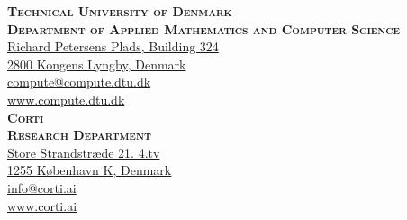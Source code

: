 
\thispagestyle{empty} %

\vspace*{\fill}
\small%
\noindent
\textsc{\textbf{Technical University of Denmark}}\\
\textsc{\textbf{Department of Applied Mathematics and Computer Science}}
\smallskip\\
\href{https://goo.gl/maps/Dx6rNjGT9Ad5xKgZ6}{%
Richard Petersens Plads, Building 324\\
2800 Kongens Lyngby, Denmark}\\
\href{mailto:compute@compute.dtu.dk}{compute@compute.dtu.dk}\\
\href{www.compute.dtu.dk}{www.compute.dtu.dk}
\bigskip\\
\noindent
\textsc{\textbf{Corti}}\\
\textsc{\textbf{Research Department}}
\smallskip\\
\href{https://goo.gl/maps/X7en4p8vaHkfVuyJ7}{%
Store Strandstræde 21. 4.tv\\
1255 København K, Denmark}\\
\href{mailto:info@corti.ai}{info@corti.ai}\\
\href{www.corti.ai}{www.corti.ai}\\

\normalsize
\normalfont